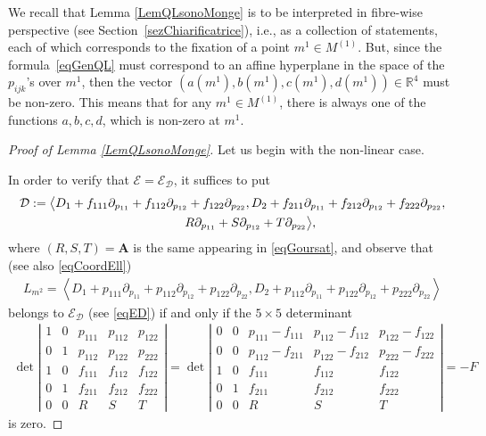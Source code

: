 \documentclass[pdftex]{sigma}
\newcommand{\R}{\mathbb{R}}
\newcommand{\D}{\mathcal{D}}
\newcommand{\E}{\mathcal{E}}
\newcommand{\Span}[1]{\left\langle #1 \right\rangle}
\numberwithin{equation}{section}
\begin{document}
We recall that Lemma \ref{LemQLsonoMonge} is to be interpreted in f\/ibre-wise perspective (see Section~\ref{sezChiarificatrice}), i.e., as a collection of statements, each of which corresponds to the f\/ixation of a point $m^1\in M^{(1)}$. But, since the formula~\eqref{eqGenQL} must correspond to an af\/f\/ine hyperplane in the space of the $p_{ijk}$'s over $m^1$, then the vector $(a(m^1),b(m^1),c(m^1),d(m^1))\in\R^4 $ must be non-zero. This means that for any $m^1\in M^{(1)}$, there is always one of the functions $a,b,c,d$, which is non-zero at $m^1$.

\begin{proof}[Proof of Lemma \ref{LemQLsonoMonge}]
Let us begin with the non-linear case.

In order to verify that $\E=\E_\D$, it suf\/f\/ices to put
\begin{gather}
\D:= \big\langle D_1 + f_{111}\partial_{p_{11}} + f_{112}\partial_{p_{12}} + f_{122}\partial_{p_{22}}, D_2 + f_{211}\partial_{p_{11}} + f_{212}\partial_{p_{12}} + f_{222}\partial_{p_{22}},\nonumber \\
\hphantom{\D:=\big\langle}{} R\partial_{p_{11}}+S\partial_{p_{12}}+T\partial_{p_{22}}\big\rangle,\label{eq.D.Goursat.nonlin}
\end{gather}
where $(R,S,T)=\boldsymbol{A}$ is the same appearing in \eqref{eqGoursat}, and
observe that (see also \eqref{eqCoordEll})
 \begin{gather*}
L_{m^2}=\Span{ D_1+ p_{111}\partial_{p_{11}}+p_{112}\partial_{p_{12}}+p_{122}\partial_{p_{22}}, D_2 + p_{112}\partial_{p_{11}}+p_{122}\partial_{p_{12}}+p_{222}\partial_{p_{22}} }
\end{gather*}
belongs to $\E_{\D}$ (see \eqref{eqED}) if and only if the $5\times 5$ determinant
\begin{gather*}%
\det\left|\begin{matrix}
1 & 0 & p_{111} & p_{112} & p_{122}
\\
0 & 1 & p_{112} & p_{122} & p_{222}
\\
1 & 0 & f_{111} & f_{112} & f_{122}
\\
0 & 1 & f_{211} & f_{212} & f_{222}
\\
0 & 0 & R & S & T
\end{matrix}\right|
=
\det \left|
\begin{matrix}
0 & 0 & p_{111}-f_{111} & p_{112} -f_{112}& p_{122} -f_{122}
\\
0 & 0 & p_{112}-f_{211} & p_{122}-f_{212} & p_{222}-f_{222}
\\
1 & 0 & f_{111} & f_{112} & f_{122}
\\
0 & 1 & f_{211} & f_{212} & f_{222}
\\
0 & 0 & R & S & T
\end{matrix}\right|=-F
\end{gather*}
is zero.


\end{proof}
\end{document}
